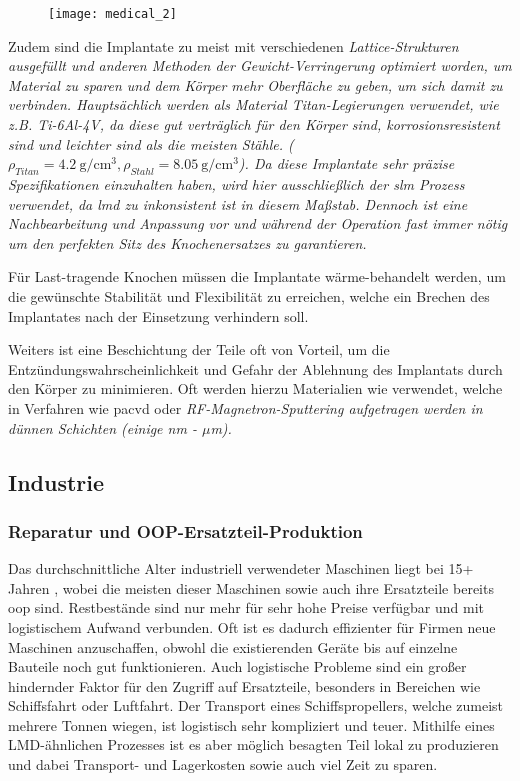 \documentclass[../main.tex]{subfiles}
\begin{document}
\begin{figure}[H]
	\centering
	\texttt{[image: medical\_2]}
	\label{img:medical}
\end{figure} 
Zudem sind die Implantate zu meist mit verschiedenen \it{Lattice}-Strukturen ausgefüllt und anderen Methoden der Gewicht-Verringerung optimiert worden, um Material zu sparen und dem Körper mehr Oberfläche zu geben, um sich damit zu verbinden. Hauptsächlich werden als Material Titan-Legierungen verwendet, wie z.B. Ti-6Al-4V, da diese gut verträglich für den Körper sind, korrosionsresistent sind und leichter sind als die meisten Stähle.
($\rho_{Titan} = \qty{4.2}{\gram\per\centi\meter\cubed}, \rho_{Stahl} = \qty{8.05}{\gram\per\cm\cubed}$). \parencite{steel12709, titanium6al4v}
Da diese Implantate sehr präzise Spezifikationen einzuhalten haben, wird hier ausschließlich der \acrlong{slm} Prozess verwendet, da \acrshort{lmd} zu inkonsistent ist in diesem Maßstab. Dennoch ist eine Nachbearbeitung und Anpassung vor und während der Operation fast immer nötig um den perfekten Sitz des Knochenersatzes zu garantieren.\parencite{doi:10.1146/annurev-bioeng-082020-032402}

Für Last-tragende Knochen müssen die Implantate wärme-behandelt werden, um die gewünschte Stabilität und Flexibilität zu erreichen, welche ein Brechen des Implantates nach der Einsetzung verhindern soll.

Weiters ist eine Beschichtung der Teile oft von Vorteil, um die Entzündungswahrscheinlichkeit und Gefahr der Ablehnung des Implantats durch den Körper zu minimieren. Oft werden hierzu Materialien wie  verwendet, welche in Verfahren wie \acrfull{pacvd} oder \it{RF-Magnetron-Sputtering} aufgetragen werden in dünnen Schichten (einige nm - $\mu$m).\parencite{Chudinova2016}

 
\subsection{Industrie}
\subsubsection{Reparatur und OOP-Ersatzteil-Produktion}
Das durchschnittliche Alter industriell verwendeter Maschinen liegt bei 15+ Jahren \parencite{lifespan_1}, wobei die meisten dieser Maschinen sowie auch ihre Ersatzteile bereits \acrfull{oop} sind. 
Restbestände sind nur mehr für sehr hohe Preise verfügbar und mit logistischem Aufwand verbunden. 
Oft ist es dadurch effizienter für Firmen neue Maschinen anzuschaffen, obwohl die existierenden Geräte bis auf einzelne Bauteile noch gut funktionieren. 
Auch logistische Probleme sind ein großer hindernder Faktor für den Zugriff auf Ersatzteile, besonders in Bereichen wie Schiffsfahrt oder Luftfahrt. Der Transport eines Schiffspropellers, welche zumeist mehrere Tonnen wiegen, ist logistisch sehr kompliziert und teuer.  
Mithilfe eines LMD-ähnlichen Prozesses ist es aber möglich besagten Teil lokal zu produzieren \parencite{ship_1} und dabei Transport- und Lagerkosten sowie auch viel Zeit zu sparen. 
\end{document}
